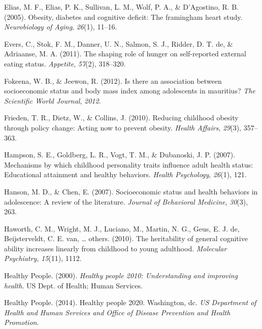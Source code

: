\documentclass[man]{apa6}
\begin{document}
\leavevmode\hypertarget{ref-elias2005obesity}{}%
Elias, M. F., Elias, P. K., Sullivan, L. M., Wolf, P. A., \& D'Agostino, R. B. (2005). Obesity, diabetes and cognitive deficit: The framingham heart study. \emph{Neurobiology of Aging}, \emph{26}(1), 11--16.

\leavevmode\hypertarget{ref-evers2011shaping}{}%
Evers, C., Stok, F. M., Danner, U. N., Salmon, S. J., Ridder, D. T. de, \& Adriaanse, M. A. (2011). The shaping role of hunger on self-reported external eating status. \emph{Appetite}, \emph{57}(2), 318--320.

\leavevmode\hypertarget{ref-fokeena2012there}{}%
Fokeena, W. B., \& Jeewon, R. (2012). Is there an association between socioeconomic status and body mass index among adolescents in mauritius? \emph{The Scientific World Journal}, \emph{2012}.

\leavevmode\hypertarget{ref-frieden2010reducing}{}%
Frieden, T. R., Dietz, W., \& Collins, J. (2010). Reducing childhood obesity through policy change: Acting now to prevent obesity. \emph{Health Affairs}, \emph{29}(3), 357--363.

\leavevmode\hypertarget{ref-hampson2007mechanisms}{}%
Hampson, S. E., Goldberg, L. R., Vogt, T. M., \& Dubanoski, J. P. (2007). Mechanisms by which childhood personality traits influence adult health status: Educational attainment and healthy behaviors. \emph{Health Psychology}, \emph{26}(1), 121.

\leavevmode\hypertarget{ref-hanson2007socioeconomic}{}%
Hanson, M. D., \& Chen, E. (2007). Socioeconomic status and health behaviors in adolescence: A review of the literature. \emph{Journal of Behavioral Medicine}, \emph{30}(3), 263.

\leavevmode\hypertarget{ref-haworth2010heritability}{}%
Haworth, C. M., Wright, M. J., Luciano, M., Martin, N. G., Geus, E. J. de, Beijsterveldt, C. E. van, \ldots{} others. (2010). The heritability of general cognitive ability increases linearly from childhood to young adulthood. \emph{Molecular Psychiatry}, \emph{15}(11), 1112.

\leavevmode\hypertarget{ref-healthy2000healthy}{}%
Healthy People. (2000). \emph{Healthy people 2010: Understanding and improving health}. US Dept. of Health; Human Services.

\leavevmode\hypertarget{ref-us2014healthy}{}%
Healthy People. (2014). Healthy people 2020. Washington, dc. \emph{US Department of Health and Human Services and Office of Disease Prevention and Health Promotion}.
\end{document}
